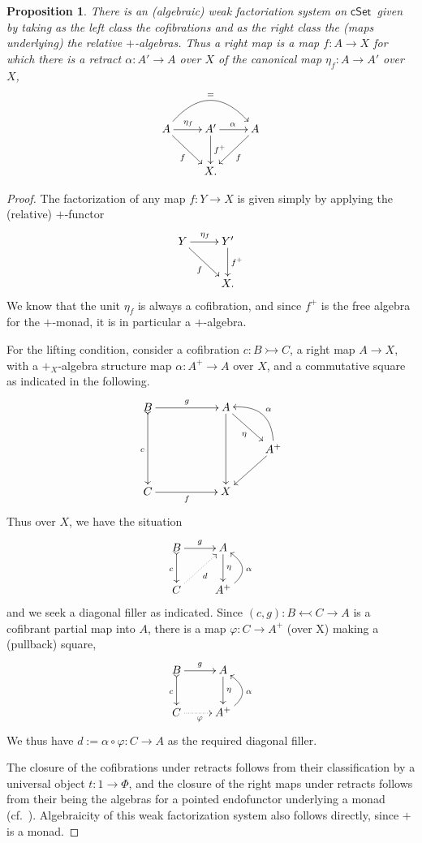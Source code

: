 \documentclass[12pt]{article}
\newcommand{\cSet}{\ensuremath{\mathsf{cSet}}}
\newcommand{\mono}{\ensuremath{\rightarrowtail}}
\newcommand{\ra}{\ensuremath{\rightarrow}}
\newtheorem{proposition}[theorem]{Proposition}
\theoremstyle{remark}
\theoremstyle{definition}
\begin{document}
\begin{proposition}
There is an (algebraic) weak factoriation system on \cSet\ given by taking as the left class the cofibrations and as the right class the (maps underlying) the relative $+$-algebras. Thus a right map is a map $f :A\ra X$ for which there is a retract $\alpha : A'\ra A$ over $X$ of the canonical map $\eta_f : A\ra A'$ over $X$,
\[
\xymatrix{
A\ar[rd]_{f} \ar[r]^{\eta_f} \ar@/^6ex/ [rr]^= & A' \ar[r]^{\alpha} \ar[d]^-{f^+} & \ar[ld]^{f} A \\
& X. &
}
\]
\end{proposition}
\begin{proof}
The factorization of any map $f : Y\ra X$ is given simply by applying the (relative) $+$-functor
\[
\xymatrix{
Y\ar[rd]_{f} \ar[r]^{\eta_f} & Y' \ar[d]^-{f^+} \\
& X. 
}
\]
We know that the unit $\eta_f$ is always a cofibration, and since $f^+$ is the free algebra for the $+$-monad, it is in particular a $+$-algebra.

For the lifting condition, consider a cofibration $c : B\mono C$, a right map $A\ra X$, with a $+_X$-algebra structure map $\alpha: A^+ \ra A$ over $X$, and a commutative square as indicated in the following.
\[
\xymatrix{
B \ar@{>->}[dd]_{c} \ar[rr]^{g}  && A \ar[dd] \ar[rd]_{\eta} & \\
 &&& A^+ \ar@/_4ex/ [lu]_\alpha  \ar[ld] \\
C \ar[rr]_{f} && X &
}
\]
Thus over $X$, we have the situation
\[
\xymatrix{
B\ar@{>->}[d]_{c} \ar[r]^{g} & A \ar[d]^-{\eta} \\
C \ar@{.>}[ru]_{d} & A^+ \ar@/_4ex/ [u]_\alpha
}
\]
and we seek a diagonal filler as indicated.
Since $(c,g) : B \leftarrowtail C \ra A$ is a cofibrant partial map into $A$, there is a map $\varphi : C \ra A^+$ (over X) making a (pullback) square,
\[
\xymatrix{
B\ar@{>->}[d]_{c} \ar[r]^{g} & A \ar[d]^-{\eta} \\
C \ar@{.>}[r]_{\varphi} & A^+ \ar@/_4ex/ [u]_\alpha
}
\]
We thus have $d := \alpha\circ \varphi : C \ra A$ as the required diagonal filler.

The closure of the cofibrations under retracts follows from their classification by a universal object $t : 1 \ra \Phi$, and the closure of the right maps under retracts follows from their being the algebras for a pointed endofunctor underlying a monad (cf.~\cite{RV}).  Algebraicity of this weak factorization system also follows directly, since $+$ is a monad.
\end{proof}
\end{document}

